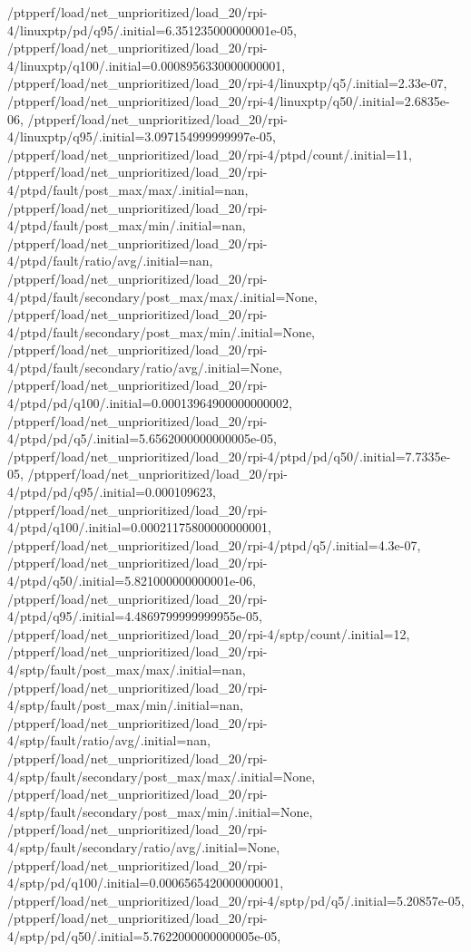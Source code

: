 {    /ptpperf/load/net_unprioritized/load_20/rpi-4/linuxptp/pd/q95/.initial=6.351235000000001e-05,
    /ptpperf/load/net_unprioritized/load_20/rpi-4/linuxptp/q100/.initial=0.0008956330000000001,
    /ptpperf/load/net_unprioritized/load_20/rpi-4/linuxptp/q5/.initial=2.33e-07,
    /ptpperf/load/net_unprioritized/load_20/rpi-4/linuxptp/q50/.initial=2.6835e-06,
    /ptpperf/load/net_unprioritized/load_20/rpi-4/linuxptp/q95/.initial=3.097154999999997e-05,
    /ptpperf/load/net_unprioritized/load_20/rpi-4/ptpd/count/.initial=11,
    /ptpperf/load/net_unprioritized/load_20/rpi-4/ptpd/fault/post_max/max/.initial=nan,
    /ptpperf/load/net_unprioritized/load_20/rpi-4/ptpd/fault/post_max/min/.initial=nan,
    /ptpperf/load/net_unprioritized/load_20/rpi-4/ptpd/fault/ratio/avg/.initial=nan,
    /ptpperf/load/net_unprioritized/load_20/rpi-4/ptpd/fault/secondary/post_max/max/.initial=None,
    /ptpperf/load/net_unprioritized/load_20/rpi-4/ptpd/fault/secondary/post_max/min/.initial=None,
    /ptpperf/load/net_unprioritized/load_20/rpi-4/ptpd/fault/secondary/ratio/avg/.initial=None,
    /ptpperf/load/net_unprioritized/load_20/rpi-4/ptpd/pd/q100/.initial=0.00013964900000000002,
    /ptpperf/load/net_unprioritized/load_20/rpi-4/ptpd/pd/q5/.initial=5.6562000000000005e-05,
    /ptpperf/load/net_unprioritized/load_20/rpi-4/ptpd/pd/q50/.initial=7.7335e-05,
    /ptpperf/load/net_unprioritized/load_20/rpi-4/ptpd/pd/q95/.initial=0.000109623,
    /ptpperf/load/net_unprioritized/load_20/rpi-4/ptpd/q100/.initial=0.00021175800000000001,
    /ptpperf/load/net_unprioritized/load_20/rpi-4/ptpd/q5/.initial=4.3e-07,
    /ptpperf/load/net_unprioritized/load_20/rpi-4/ptpd/q50/.initial=5.821000000000001e-06,
    /ptpperf/load/net_unprioritized/load_20/rpi-4/ptpd/q95/.initial=4.4869799999999955e-05,
    /ptpperf/load/net_unprioritized/load_20/rpi-4/sptp/count/.initial=12,
    /ptpperf/load/net_unprioritized/load_20/rpi-4/sptp/fault/post_max/max/.initial=nan,
    /ptpperf/load/net_unprioritized/load_20/rpi-4/sptp/fault/post_max/min/.initial=nan,
    /ptpperf/load/net_unprioritized/load_20/rpi-4/sptp/fault/ratio/avg/.initial=nan,
    /ptpperf/load/net_unprioritized/load_20/rpi-4/sptp/fault/secondary/post_max/max/.initial=None,
    /ptpperf/load/net_unprioritized/load_20/rpi-4/sptp/fault/secondary/post_max/min/.initial=None,
    /ptpperf/load/net_unprioritized/load_20/rpi-4/sptp/fault/secondary/ratio/avg/.initial=None,
    /ptpperf/load/net_unprioritized/load_20/rpi-4/sptp/pd/q100/.initial=0.0006565420000000001,
    /ptpperf/load/net_unprioritized/load_20/rpi-4/sptp/pd/q5/.initial=5.20857e-05,
    /ptpperf/load/net_unprioritized/load_20/rpi-4/sptp/pd/q50/.initial=5.7622000000000005e-05,
}
